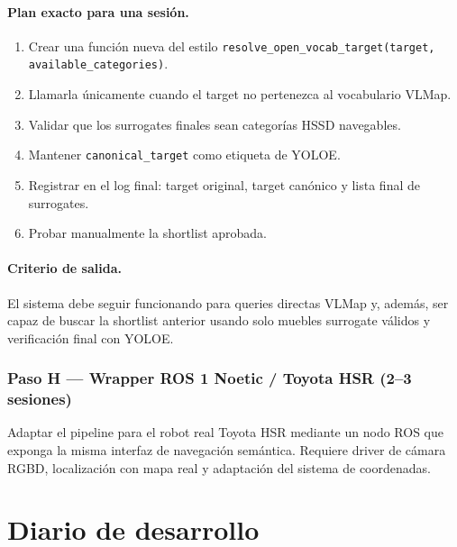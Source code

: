 \documentclass[11pt,a4paper]{article}
\begin{document}
\paragraph{Plan exacto para una sesión.}
\begin{enumerate}
  \item Crear una función nueva del estilo
        \texttt{resolve\_open\_vocab\_target(target, available\_categories)}.
  \item Llamarla únicamente cuando el target no pertenezca al vocabulario VLMap.
  \item Validar que los surrogates finales sean categorías HSSD navegables.
  \item Mantener \texttt{canonical\_target} como etiqueta de YOLOE.
  \item Registrar en el log final: target original, target canónico y lista
        final de surrogates.
  \item Probar manualmente la shortlist aprobada.
\end{enumerate}

\paragraph{Criterio de salida.} El sistema debe seguir funcionando para queries
directas VLMap y, además, ser capaz de buscar la shortlist anterior usando solo
muebles surrogate válidos y verificación final con YOLOE.

\subsubsection*{Paso H --- Wrapper ROS 1 Noetic / Toyota HSR (2--3 sesiones)}

Adaptar el pipeline para el robot real Toyota HSR mediante un nodo ROS que exponga
la misma interfaz de navegación semántica. Requiere driver de cámara RGBD, localización
con mapa real y adaptación del sistema de coordenadas.

\section{Diario de desarrollo}

\end{document}
